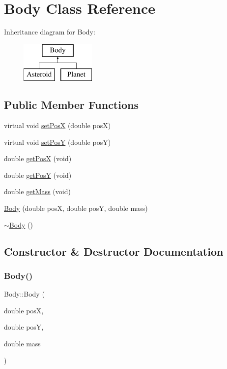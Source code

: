 \hypertarget{class_body}{}\section{Body Class Reference}
\label{class_body}
Inheritance diagram for Body\+:\begin{figure}[H]
\begin{center}
\leavevmode
\includegraphics[height=2.000000cm]{class_body}
\end{center}
\end{figure}
\subsection*{Public Member Functions}
\begin{DoxyCompactItemize}
\item 
virtual void \hyperlink{class_body_a14266f71a12e9ccab50afa62c92f57f6}{set\+PosX} (double posX)
\item 
virtual void \hyperlink{class_body_ae2d1b21596116c4d7e863420ea500ac8}{set\+PosY} (double posY)
\item 
double \hyperlink{class_body_aad904543c769a0fa454d2ef9b98c4cd4}{get\+PosX} (void)
\item 
double \hyperlink{class_body_aaa6bdeccdffda065788bf9194fb93a6a}{get\+PosY} (void)
\item 
double \hyperlink{class_body_a3620d6fdf0280daec1c1bf7c75fb4bc4}{get\+Mass} (void)
\item 
\hyperlink{class_body_ac8304d77f5f5b281a54c53e17cb4b4b8}{Body} (double posX, double posY, double mass)
\item 
\hyperlink{class_body_abe1c4da65568cf7978b6247affc461e3}{$\sim$\+Body} ()
\end{DoxyCompactItemize}


\subsection{Constructor \& Destructor Documentation}
\mbox{\label{class_body_ac8304d77f5f5b281a54c53e17cb4b4b8}} 
\subsubsection{\texorpdfstring{Body()}{Body()}}
{\footnotesize\ttfamily Body\+::\+Body (\begin{DoxyParamCaption}\item[{double}]{posX,  }\item[{double}]{posY,  }\item[{double}]{mass }\end{DoxyParamCaption})}

